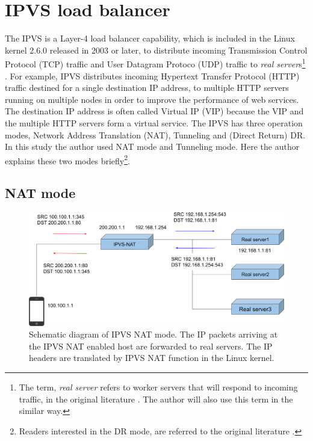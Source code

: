 \FloatBarrier

\section{IPVS load balancer}

The IPVS is a Layer-4 load balancer capability, which is included in the Linux kernel 2.6.0 released in 2003 or later, 
to distribute incoming Transmission Control Protocol (TCP) traffic and User Datagram Protoco (UDP) traffic to
{\em real server}s\footnote{The term, {\em real server} refers to worker servers that will respond to incoming traffic, 
in the original literature \cite{Zhang2000}. The author will also use this term in the similar way.} \cite{Zhang2000}.
For example, IPVS distributes incoming Hypertext Transfer Protocol (HTTP) traffic destined for a single destination IP address, to multiple HTTP servers running on multiple nodes in order to improve the performance of web services.
The destination IP address is often called Virtual IP (VIP) because the VIP and the multiple HTTP servers form a virtual service.
The IPVS has three operation modes, Network Address Translation (NAT), Tunneling and (Direct Return) DR.
In this study the author used NAT mode and Tunneling mode.
Here the author explains these two modes briefly\footnote{Readers interested in the DR mode, are referred to the original literature \cite{Zhang2000}.}.

\subsection{NAT mode}

\begin{figure}[h]
  \centering
  \includegraphics[width=0.95\columnwidth]{Figs/ipvs-nat-schem}

  \par\bigskip
  \centering
  \begin{minipage}{0.9\columnwidth}
    \caption[IPVS NAT mode]{
    Schematic diagram of IPVS NAT mode.
    The IP packets arriving at the IPVS NAT enabled host are forwarded to real servers.
    The IP headers are translated by IPVS NAT function in the Linux kernel.
    }
    \label{fig:ipvs-nat-schem}
  \end{minipage}
\end{figure}

